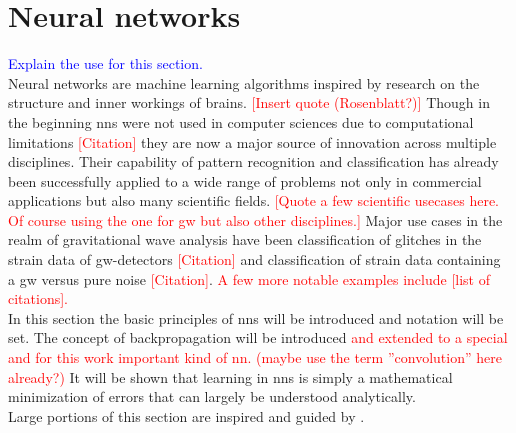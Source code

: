 \section{Neural networks}
\textcolor{blue}{Explain the use for this section.}\\
\noindent Neural networks are machine learning algorithms inspired by research on the structure and inner workings of brains. \textcolor{red}{[Insert quote (Rosenblatt?)]} Though in the beginning \gls{nns} were not used in computer sciences due to computational limitations \textcolor{red}{[Citation]} they are now a major source of innovation across multiple disciplines. Their capability of pattern recognition and classification has already been successfully applied to a wide range of problems not only in commercial applications but also many scientific fields. \textcolor{red}{[Quote a few scientific usecases here. Of course using the one for gw but also other disciplines.]} Major use cases in the realm of gravitational wave analysis have been classification of glitches in the strain data of \gls{gw}-detectors \textcolor{red}{[Citation]} and classification of strain data containing a \gls{gw} versus pure noise \textcolor{red}{[Citation]}. \textcolor{red}{A few more notable examples include [list of citations].}\\
In this section the basic principles of \gls{nns} will be introduced and notation will be set. The concept of backpropagation will be introduced \textcolor{red}{and extended to a special and for this work important kind of \gls{nn}. (maybe use the term ''convolution'' here already?)} It will be shown that learning in \gls{nns} is simply a mathematical minimization of errors that can largely be understood analytically.\medskip\\
Large portions of this section are inspired and guided by \cite{deep_learning_beginning, deep_learning_book}.

\begin{comment}
Neural networks have become a new and major player in data sciences over the past few years. They have proven to be very good at classification and interpolation. \textcolor{red}{[Insert ref]} Therefore and due to their computational efficiency they seem to be a compelling option even for scientific use cases and have been successfully applied to the classification and basic parameter estimation of \gls{gw}-data.\\
This sections aims to convey the basics of neural networks and the layers that are being utilized in this work. After having read this section it should be clear that neural networks are simply a mathematical model and that there is no magic involved. \textcolor{red}{(Maybe this is too prosa-like and/or should be put into the introduction)}
\end{comment}


